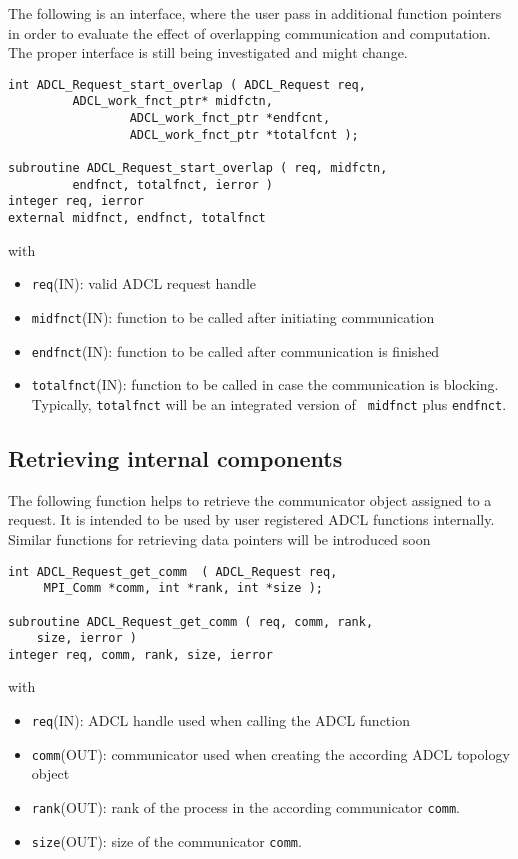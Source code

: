 The following is an interface, where the user pass in additional function
pointers in order to evaluate the effect of overlapping communication and
computation. The proper interface is still being investigated and might
change.

\begin{verbatim}
int ADCL_Request_start_overlap ( ADCL_Request req, 
         ADCL_work_fnct_ptr* midfctn,
				 ADCL_work_fnct_ptr *endfcnt, 
				 ADCL_work_fnct_ptr *totalfcnt );

subroutine ADCL_Request_start_overlap ( req, midfctn,
         endfnct, totalfnct, ierror )
integer req, ierror
external midfnct, endfnct, totalfnct
\end{verbatim}
with
\begin{itemize}
\item {\tt req}(IN): valid ADCL request handle
\item {\tt midfnct}(IN): function to be called after initiating communication
\item {\tt endfnct}(IN): function to be called after communication is finished
\item {\tt totalfnct}(IN): function to be called in case the communication is
  blocking. Typically, {\tt totalfnct} will be an integrated version of {\tt
    midfnct} plus {\tt endfnct}.
\end{itemize}
\hspace{1cm}

\subsection{Retrieving internal components}

The following function helps to retrieve the communicator object assigned to a
request. It is intended to be used by user registered ADCL functions
internally. Similar functions for retrieving data pointers will be introduced
soon

\begin{verbatim}
int ADCL_Request_get_comm  ( ADCL_Request req, 
     MPI_Comm *comm, int *rank, int *size );
     
subroutine ADCL_Request_get_comm ( req, comm, rank,
    size, ierror )
integer req, comm, rank, size, ierror     
\end{verbatim}
with
\begin{itemize}
\item {\tt req}(IN): ADCL handle used when calling the ADCL function
\item {\tt comm}(OUT): communicator used when creating the according ADCL topology object
\item {\tt rank}(OUT): rank of the process in the according communicator {\tt comm}.
\item {\tt size}(OUT): size of the communicator {\tt comm}.
\end{itemize}
\hspace{1cm}


